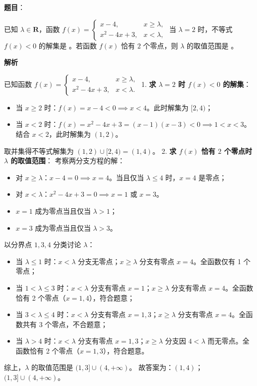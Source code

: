 \begin{answer}

\textbf{题目}：

已知 $\lambda \in \mathbf R$，函数 $f(x) = \begin{cases} x - 4, & x \geqslant \lambda, \\ x^2 - 4x + 3, & x < \lambda, \end{cases}$ 当 $\lambda = 2$ 时，不等式 $f(x) < 0$ 的解集是 \underline{\hspace{2cm}}。若函数 $f(x)$ 恰有 $2$ 个零点，则 $\lambda$ 的取值范围是 \underline{\hspace{2cm}}。

\textbf{解析}

已知函数 $f(x) = \begin{cases} x - 4, & x \geqslant \lambda, \\ x^2 - 4x + 3, & x < \lambda. \end{cases}$
1. \textbf{求 $\lambda = 2$ 时 $f(x) < 0$ 的解集}：
\begin{itemize}
\item 当 $x \geqslant 2$ 时：$f(x) = x - 4 < 0 \implies x < 4$。此时解集为 $[2, 4)$；
\item 当 $x < 2$ 时：$f(x) = x^2 - 4x + 3 = (x - 1)(x - 3) < 0 \implies 1 < x < 3$。结合 $x < 2$，此时解集为 $(1, 2)$。
\end{itemize}
   取并集得不等式解集为 $(1, 2) \cup [2, 4) = (1, 4)$。
2. \textbf{求 $f(x)$ 恰有 $2$ 个零点时 $\lambda$ 的取值范围}：
   考察两分支方程的解：
\begin{itemize}
\item 对 $x \geqslant \lambda$：$x - 4 = 0 \implies x = 4$。当且仅当 $\lambda \leqslant 4$ 时，$x = 4$ 是零点；
\item 对 $x < \lambda$：$x^2 - 4x + 3 = 0 \implies x = 1$ 或 $x = 3$。
\item $x = 1$ 成为零点当且仅当 $\lambda > 1$；
\item $x = 3$ 成为零点当且仅当 $\lambda > 3$。
\end{itemize}
   以分界点 $1, 3, 4$ 分类讨论 $\lambda$：
\begin{itemize}
\item 当 $\lambda \leqslant 1$ 时：$x < \lambda$ 分支无零点；$x \geqslant \lambda$ 分支有零点 $x = 4$。全函数仅有 1 个零点；
\item 当 $1 < \lambda \leqslant 3$ 时：$x < \lambda$ 分支有零点 $x = 1$；$x \geqslant \lambda$ 分支有零点 $x = 4$。全函数恰有 2 个零点（$x = 1, 4$），符合题意；
\item 当 $3 < \lambda \leqslant 4$ 时：$x < \lambda$ 分支有零点 $x = 1, 3$；$x \geqslant \lambda$ 分支有零点 $x = 4$。全函数共有 3 个零点，不合题意；
\item 当 $\lambda > 4$ 时：$x < \lambda$ 分支有零点 $x = 1, 3$；$x \geqslant \lambda$ 分支因 $4 < \lambda$ 而无零点。全函数恰有 2 个零点（$x = 1, 3$），符合题意。
\end{itemize}
   综上，$\lambda$ 的取值范围是 $(1, 3] \cup (4, +\infty)$。
故答案为：$(1, 4)$；$(1, 3] \cup (4, +\infty)$。

\gkanswer{答案：$(1, 4)$；$(1, 3] \cup (4, +\infty)$}

\end{answer}
